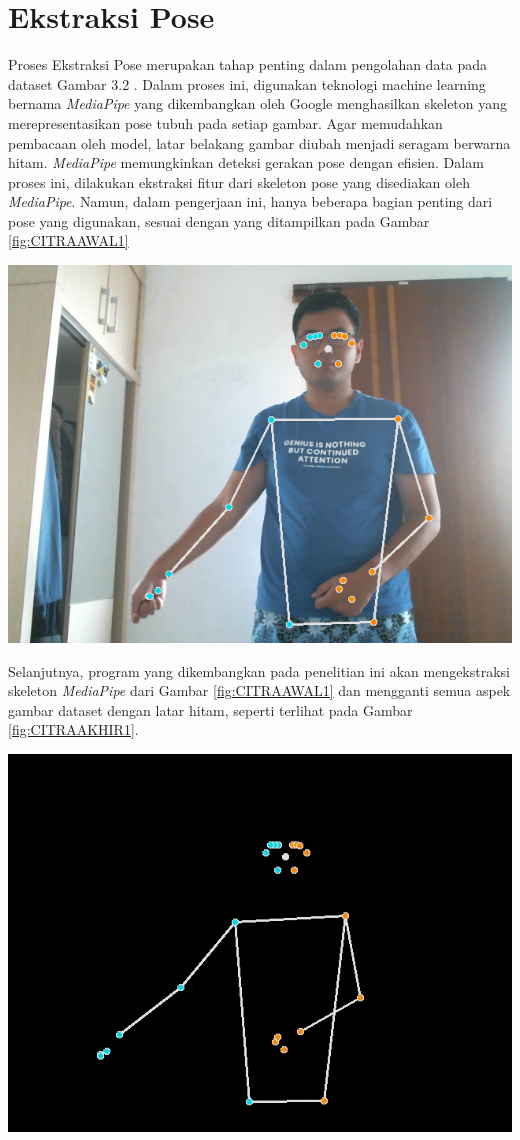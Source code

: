 \section{Ekstraksi Pose}
Proses Ekstraksi Pose merupakan tahap penting dalam pengolahan data pada dataset Gambar 3.2 . Dalam proses ini, digunakan teknologi machine learning bernama \textit{MediaPipe} yang dikembangkan oleh Google menghasilkan skeleton yang merepresentasikan pose tubuh pada setiap gambar. Agar memudahkan pembacaan oleh model, latar belakang gambar diubah menjadi seragam berwarna hitam. \textit{MediaPipe} memungkinkan deteksi gerakan pose dengan efisien. Dalam proses ini, dilakukan ekstraksi fitur dari skeleton pose yang disediakan oleh \textit{MediaPipe}. Namun, dalam pengerjaan ini, hanya beberapa bagian penting dari  pose yang digunakan, sesuai dengan yang ditampilkan pada Gambar \ref{fig:CITRAAWAL1}
\begin{center}
	\includegraphics[width=0.7\linewidth]{gambar/Gambar3.3.png}
	\label{fig:CITRAAWAL1}
\end{center}
Selanjutnya, program yang dikembangkan pada penelitian ini akan mengekstraksi skeleton \textit{MediaPipe} dari Gambar \ref{fig:CITRAAWAL1} dan mengganti semua aspek gambar dataset dengan latar hitam, seperti terlihat pada Gambar \ref{fig:CITRAAKHIR1}.
\begin{center}
	\includegraphics[width=0.7\linewidth]{gambar/Gambar3.4.jpg}
	\label{fig:CITRAAKHIR1}
\end{center}
